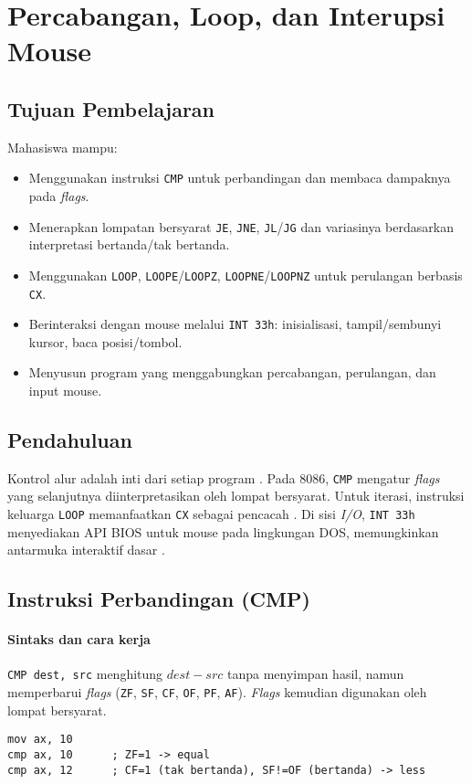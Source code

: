 \chapter{Percabangan, Loop, dan Interupsi Mouse}

\section{Tujuan Pembelajaran}
Mahasiswa mampu:
\begin{itemize}
    \item Menggunakan instruksi \texttt{CMP} untuk perbandingan dan membaca dampaknya pada \textit{flags}.
    \item Menerapkan lompatan bersyarat \texttt{JE}, \texttt{JNE}, \texttt{JL}/\texttt{JG} dan variasinya berdasarkan interpretasi bertanda/tak bertanda.
    \item Menggunakan \texttt{LOOP}, \texttt{LOOPE}/\texttt{LOOPZ}, \texttt{LOOPNE}/\texttt{LOOPNZ} untuk perulangan berbasis \texttt{CX}.
    \item Berinteraksi dengan mouse melalui \texttt{INT 33h}: inisialisasi, tampil/sembunyi kursor, baca posisi/tombol.
    \item Menyusun program yang menggabungkan percabangan, perulangan, dan input mouse.
\end{itemize}

\section{Pendahuluan}
Kontrol alur adalah inti dari setiap program \cite{susanto1995belajar}. Pada 8086, \texttt{CMP} mengatur \textit{flags} yang selanjutnya diinterpretasikan oleh lompat bersyarat. Untuk iterasi, instruksi keluarga \texttt{LOOP} memanfaatkan \texttt{CX} sebagai pencacah \cite{hyde2010art}. Di sisi \textit{I/O}, \texttt{INT 33h} menyediakan API BIOS untuk mouse pada lingkungan DOS, memungkinkan antarmuka interaktif dasar \cite{nopi2003tutorial}.

\section{Instruksi Perbandingan (CMP)}
\subsubsection{Sintaks dan cara kerja}
\texttt{CMP dest, src} menghitung \(dest - src\) tanpa menyimpan hasil, namun memperbarui \textit{flags} (\texttt{ZF}, \texttt{SF}, \texttt{CF}, \texttt{OF}, \texttt{PF}, \texttt{AF}). \textit{Flags} kemudian digunakan oleh lompat bersyarat.
\begin{verbatim}
mov ax, 10
cmp ax, 10      ; ZF=1 -> equal
cmp ax, 12      ; CF=1 (tak bertanda), SF!=OF (bertanda) -> less
\end{verbatim}

